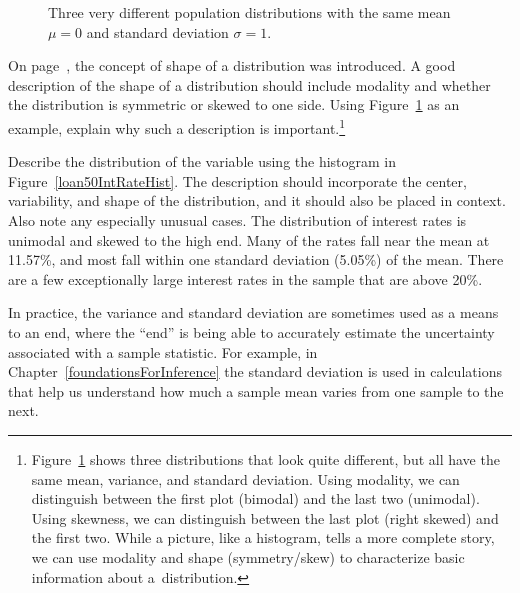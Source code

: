 \begin{figure}
  \centering
  \caption{Three very different population distributions
      with the same mean $\mu=0$ and standard deviation
      $\sigma=1$.}
  \label{severalDiffDistWithSdOf1}
\end{figure}

\begin{exercise}
On page~\pageref{shapeFirstDiscussed}, the concept of
shape of a distribution was introduced.
A good description of the shape of a distribution should
include modality and whether the distribution is symmetric
or skewed to one side.
Using Figure~\ref{severalDiffDistWithSdOf1} as an example,
explain why such a description is
important.\footnote{Figure~\ref{severalDiffDistWithSdOf1}
  shows three distributions that look quite different,
  but all have the same mean, variance,
  and standard deviation.
  Using modality, we can distinguish between the
  first plot (bimodal) and the last two (unimodal).
  Using skewness, we can distinguish between the
  last plot (right skewed) and the first two.
  While a picture, like a histogram, tells a more
  complete story, we can use modality and shape
  (symmetry/skew) to characterize basic information
  about a~distribution.}
\end{exercise}

\begin{example}{Describe the distribution of the
     variable using
    the histogram in Figure~\ref{loan50IntRateHist}.
    The description should incorporate the center,
    variability, and shape of the distribution,
    and it should also be placed in context.
    Also note any especially unusual cases.}
  The distribution of interest rates is unimodal
  and skewed to the high end.
  Many of the rates fall near the mean at 11.57\%,
  and most fall within one standard deviation (5.05\%)
  of the mean.
  There are a few exceptionally large interest rates
  in the sample that are above 20\%.
\end{example}

In practice, the variance and standard deviation are sometimes
used as a means to an end, where the ``end'' is being able to
accurately estimate the uncertainty associated with a sample
statistic.
For example, in Chapter~\ref{foundationsForInference}
the standard deviation is used in calculations that help us
understand how much a sample mean varies from one sample
to the next.


